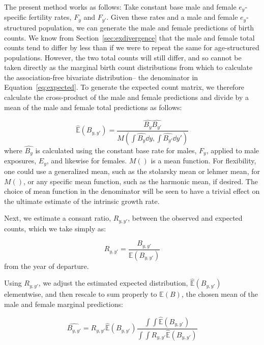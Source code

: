 
The present method works as follows: Take constant base male and female
$e_y$-specific fertility rates, $F_y$ and $F_{y'}$. Given these rates and a male
and female $e_y$-structured population, we can generate the male and female predictions of
birth counts. We know from Section~\ref{sec:exdivergence} that the male and
female total counts tend to differ by less than if we were to repeat the
same for age-structured populations. However, the two total counts will still
differ, and so cannot be taken directly as the marginal birth count distributions from
which to calculate the association-free bivariate distribution-- the denominator
in Equation~\eqref{eq:expected}. To generate the expected count matrix, we
therefore calculate the cross-product of the male and female predictions and
divide by a mean of the male and female total predictions as follows:

\begin{equation}
\label{eq:meanexp}
\widehat{\mathbb{E}}(B_{y,y'}) = \frac{\widehat{B_y} \widehat{B_{y'}}}{M(\int
\widehat{B_y} \dd y, \int \widehat{B_{y'}} \dd y')}
\end{equation}
where $\widehat{B_y}$ is calculated using the constant base rate for males,
$F_y$, applied to male exposures, $E_y$, and likewise for females. $M()$ is a
mean function. For flexibility, one could use a generalized mean, such as the
stolarsky mean or lehmer mean, for $M()$, or any specific mean function, such as
the harmonic mean, if desired. The choice of mean function in the denominator
will be seen to have a trivial effect on the ultimate estimate of the
intrinsic growth rate.

Next, we estimate a consant ratio, $R_{y,y'}$, between the
observed and expected counts, which we take simply as:

\begin{equation}
R_{y,y'} = \frac{B_{y,y'}}{\mathbb{E}(B_{y,y'})}
\end{equation}
from the year of departure.

Using $R_{y,y'}$, we adjust the estimated expected distribution,
$\widehat{\mathbb{E}}(B_{y,y'})$ elementwise, and then rescale to sum properly
to $\mathbb{E}(B)$, the chosen mean of the male and female marginal
predictions:

\begin{equation}
\label{eq:ratioadj}
\widehat{B_{y,y'}} = R_{y,y'}\widehat{\mathbb{E}}(B_{y,y'})\frac{\int \int
\widehat{\mathbb{E}}(B_{y,y'})}{\int \int
R_{y,y'}\widehat{\mathbb{E}}(B_{y,y'})}
\end{equation}

